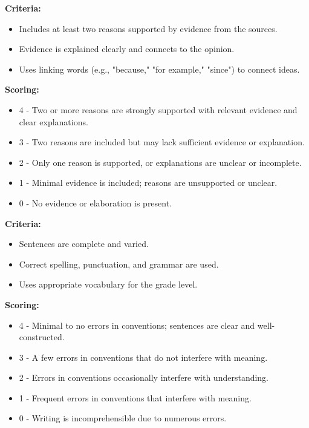\documentclass[12pt]{article}
\begin{document}
\begin{tcolorbox}[colframe=black!60, colback=white, title=Evidence and Elaboration]
\textbf{Criteria:}
\begin{itemize}
    \item Includes at least two reasons supported by evidence from the sources.
    \item Evidence is explained clearly and connects to the opinion.
    \item Uses linking words (e.g., "because," "for example," "since") to connect ideas.
\end{itemize}
\textbf{Scoring:}
\begin{itemize}
    \item 4 - Two or more reasons are strongly supported with relevant evidence and clear explanations.
    \item 3 - Two reasons are included but may lack sufficient evidence or explanation.
    \item 2 - Only one reason is supported, or explanations are unclear or incomplete.
    \item 1 - Minimal evidence is included; reasons are unsupported or unclear.
    \item 0 - No evidence or elaboration is present.
\end{itemize}
\end{tcolorbox}

\begin{tcolorbox}[colframe=black!60, colback=white, title=Language and Conventions]
\textbf{Criteria:}
\begin{itemize}
    \item Sentences are complete and varied.
    \item Correct spelling, punctuation, and grammar are used.
    \item Uses appropriate vocabulary for the grade level.
\end{itemize}
\textbf{Scoring:}
\begin{itemize}
    \item 4 - Minimal to no errors in conventions; sentences are clear and well-constructed.
    \item 3 - A few errors in conventions that do not interfere with meaning.
    \item 2 - Errors in conventions occasionally interfere with understanding.
    \item 1 - Frequent errors in conventions that interfere with meaning.
    \item 0 - Writing is incomprehensible due to numerous errors.
\end{itemize}
\end{tcolorbox}
\end{document}
